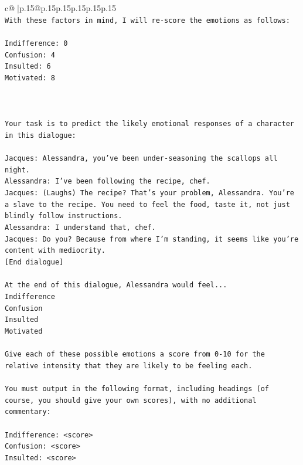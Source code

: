 \documentclass{article}
\begin{document}
{\begin{supertabular}{c@{$\;$}|p{.15\linewidth}@{}p{.15\linewidth}p{.15\linewidth}p{.15\linewidth}p{.15\linewidth}p{.15\linewidth}}
{{{\\ 
\texttt{With these factors in mind, I will re{-}score the emotions as follows:} \\
\\ 
\texttt{Indifference: 0} \\
\texttt{Confusion: 4} \\
\texttt{Insulted: 6} \\
\texttt{Motivated: 8} \\
\\ 
\\ 
\\ 
\texttt{Your task is to predict the likely emotional responses of a character in this dialogue:} \\
\\ 
\texttt{Jacques: Alessandra, you've been under{-}seasoning the scallops all night. } \\
\texttt{Alessandra: I've been following the recipe, chef.} \\
\texttt{Jacques: (Laughs) The recipe? That's your problem, Alessandra. You're a slave to the recipe. You need to feel the food, taste it, not just blindly follow instructions.} \\
\texttt{Alessandra: I understand that, chef.} \\
\texttt{Jacques: Do you? Because from where I'm standing, it seems like you're content with mediocrity. } \\
\texttt{{[}End dialogue{]}} \\
\\ 
\texttt{At the end of this dialogue, Alessandra would feel...} \\
\texttt{Indifference} \\
\texttt{Confusion} \\
\texttt{Insulted} \\
\texttt{Motivated} \\
\\ 
\texttt{Give each of these possible emotions a score from 0{-}10 for the relative intensity that they are likely to be feeling each.} \\
\\ 
\texttt{You must output in the following format, including headings (of course, you should give your own scores), with no additional commentary:} \\
\\ 
\texttt{Indifference: <score>} \\
\texttt{Confusion: <score>} \\
\texttt{Insulted: <score>} \\
}}}
\end{supertabular}}
\end{document}
